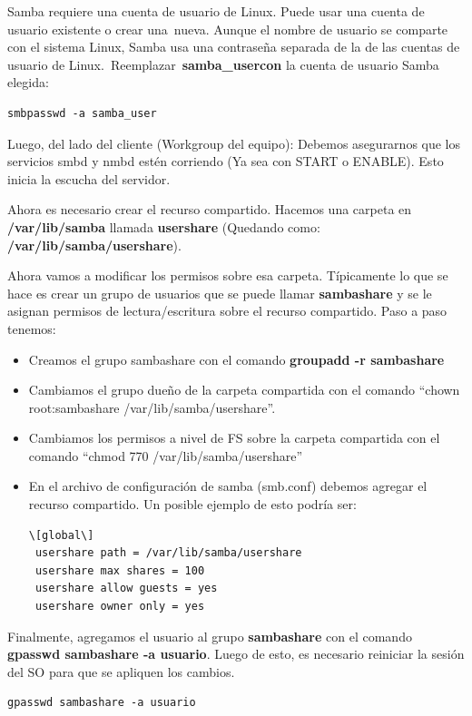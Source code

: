 \documentclass[12pt]{extarticle}
\begin{document}
Samba requiere una cuenta de usuario de Linux. Puede usar una cuenta de
usuario existente o crear una~nueva. Aunque el nombre de usuario se
comparte con el sistema Linux, Samba usa una contraseña separada de la
de las cuentas de usuario de Linux.~Reemplazar~\textbf{samba\_usercon}
la cuenta de usuario Samba elegida:

\begin{verbatim}
smbpasswd -a samba_user
\end{verbatim}

Luego, del lado del cliente (Workgroup del equipo): Debemos asegurarnos
que los servicios smbd y nmbd estén corriendo (Ya sea con START o
ENABLE). Esto inicia la escucha del servidor.

Ahora es necesario crear el recurso compartido. Hacemos una carpeta en
\textbf{/var/lib/samba} llamada \textbf{usershare} (Quedando como:
\textbf{/var/lib/samba/usershare}).

Ahora vamos a modificar los permisos sobre esa carpeta. Típicamente lo
que se hace es crear un grupo de usuarios que se puede llamar
\textbf{sambashare} y se le asignan permisos de lectura/escritura sobre
el recurso compartido. Paso a paso tenemos:

\begin{itemize}
\item
  Creamos el grupo sambashare con el comando \textbf{groupadd -r
  sambashare}
\item
  Cambiamos el grupo dueño de la carpeta compartida con el comando
  ``chown root:sambashare /var/lib/samba/usershare''.
\item
  Cambiamos los permisos a nivel de FS sobre la carpeta compartida con
  el comando ``chmod 770 /var/lib/samba/usershare''
\item
  En el archivo de configuración de samba (smb.conf) debemos agregar el
  recurso compartido. Un posible ejemplo de esto podría ser:

\begin{verbatim}
\[global\]
 usershare path = /var/lib/samba/usershare
 usershare max shares = 100
 usershare allow guests = yes
 usershare owner only = yes
\end{verbatim}
\end{itemize}

Finalmente, agregamos el usuario al grupo \textbf{sambashare} con el
comando \textbf{gpasswd sambashare -a usuario}. Luego de esto, es
necesario reiniciar la sesión del SO para que se apliquen los cambios.

\begin{verbatim}
gpasswd sambashare -a usuario
\end{verbatim}
\end{document}
